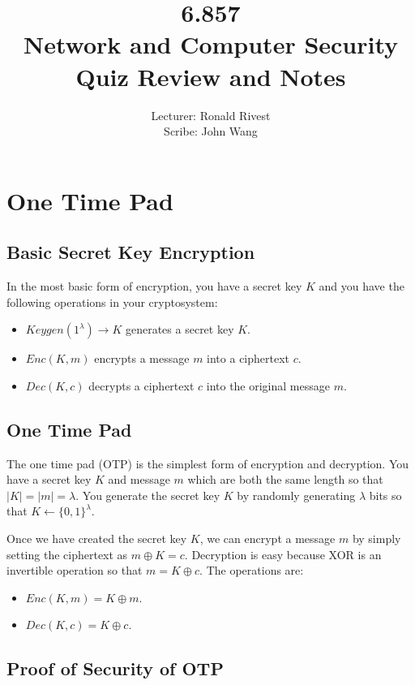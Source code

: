 \documentclass[psamsfonts]{amsart}
\title{6.857 \\
Network and Computer Security \\
Quiz Review and Notes}
\author{Lecturer: Ronald Rivest\\
Scribe: John Wang}
\begin{document}
\maketitle

\tableofcontents

\newpage

\section{One Time Pad}

\subsection{Basic Secret Key Encryption}

In the most basic form of encryption, you have a secret key $K$ and you have the following operations in your cryptosystem:
\begin{itemize}
  \item $Keygen(1^{\lambda}) \to K$ generates a secret key $K$.
  \item $Enc(K, m)$ encrypts a message $m$ into a ciphertext $c$.
  \item $Dec(K, c)$ decrypts a ciphertext $c$ into the original message $m$.
\end{itemize}

\subsection{One Time Pad}

The one time pad (OTP) is the simplest form of encryption and decryption. You have a secret key $K$ and message $m$ which are both the same length so that $|K| = |m| = \lambda$. You generate the secret key $K$ by randomly generating $\lambda$ bits so that $K \leftarrow \{0,1\}^{\lambda}$.

Once we have created the secret key $K$, we can encrypt a message $m$ by simply setting the ciphertext as $m \oplus K = c$. Decryption is easy because XOR is an invertible operation so that $m = K \oplus c$. The operations are:
\begin{itemize}
  \item $Enc(K, m) = K \oplus m$.
  \item $Dec(K, c) = K \oplus c$.
\end{itemize}

\subsection{Proof of Security of OTP}
\end{document}
